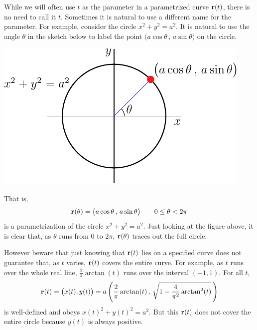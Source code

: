 \begin{eg}[Parametrization of  $x^2+y^2=a^2$]\label{eg:paramCircle}
While we will often use $t$ as the parameter in a parametrized curve $\mathbf{r}(t)$,
there is no need to call it $t$. Sometimes it is natural to use a different 
name for the parameter. For example, consider the circle $x^2+y^2=a^2$.
It is natural to use the angle $\theta$ in the sketch below to label
the point $\big(a\cos\theta\,,\,a\sin\theta\big)$ on the circle. 
\begin{efig}
\begin{center}
     \includegraphics{parCircle.pdf}
\end{center}
\end{efig}
That is,
\begin{equation*}
\mathbf{r}(\theta) = \big(a\cos\theta\,,\,a\sin\theta\big)\qquad
0\le \theta< 2\pi
\end{equation*}
is a parametrization of the circle $x^2+y^2=a^2$. Just looking at the figure above, it is clear that, as $\theta$ runs from $0$ to $2\pi$, $\mathbf{r}(\theta)$
traces out the full circle. 

However beware that just knowing that 
$\mathbf{r}(t)$ lies on a specified curve does not guarantee that, as $t$ varies,
$\mathbf{r}(t)$ covers the entire curve. For example, as $t$ runs over the whole
real line, $\frac{2}{\pi}\arctan(t)$ runs over the interval $(-1,1)$.
For all $t$,
\begin{equation*}
\mathbf{r}(t) = \big(x(t),y(t)\big) 
       = a\left(\frac{2}{\pi}\arctan(t)\,,\,
                \sqrt{1-\frac{4}{\pi^2}\arctan^2(t)}\,\right)
\end{equation*}
is well-defined and obeys $x(t)^2+y(t)^2=a^2$. But this $\mathbf{r}(t)$ does not
cover the entire circle because $y(t)$ is always positive.

\end{eg}

